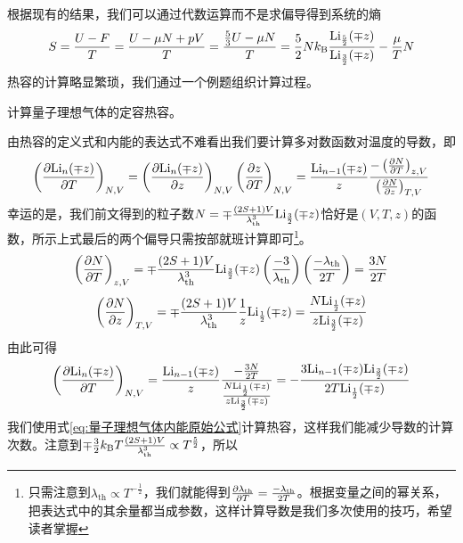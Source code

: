 \documentclass[../../main.tex]{subfiles}
\begin{document}
根据现有的结果，我们可以通过代数运算而不是求偏导得到系统的熵
\begin{equation}
    S=\frac{U-F}{T}=\frac{U-\mu N+pV}{T}=\frac{\frac{5}{3}U-\mu N}{T}=\frac{5}{2}Nk_{\mathrm{B}}\frac{\mathrm{Li}_{\frac{5}{2}}(\mp z)}{\mathrm{Li}_{\frac{3}{2}}(\mp z)}-\frac{\mu}{T}N
\end{equation}
热容的计算略显繁琐，我们通过一个例题组织计算过程。
\begin{example}
    计算量子理想气体的定容热容。
    \begin{solution}
        由热容的定义式和内能的表达式不难看出我们要计算多对数函数对温度的导数，即
        \begin{equation}
            \left(\pdv{\mathrm{Li}_{n}(\mp z)}{T}\right)_{N,V}=\left(\pdv{\mathrm{Li}_{n}(\mp z)}{z}\right)_{N,V}\left(\pdv{z}{T}\right)_{N,V}=\frac{\mathrm{Li}_{n-1}(\mp z)}{z}\frac{-\left(\pdv{N}{T}\right)_{z,V}}{\left(\pdv{N}{z}\right)_{T,V}}
        \end{equation}
        幸运的是，我们前文得到的粒子数\(N=\mp\frac{(2S+1)V}{\lambda_{\mathrm{th}}^{3}}\mathrm{Li}_{\frac{3}{2}}(\mp z)\)恰好是\((V,T,z)\)的函数，所示上式最后的两个偏导只需按部就班计算即可\footnote{只需注意到\(\lambda_{\mathrm{th}}\propto T^{-\frac{1}{2}}\)，我们就能得到\(\pdv{\lambda_{\mathrm{th}}}{T}=\frac{-\lambda_{\mathrm{th}}}{2T}\)。根据变量之间的幂关系，把表达式中的其余量都当成参数，这样计算导数是我们多次使用的技巧，希望读者掌握}。
        \begin{equation}
            \left(\pdv{N}{T}\right)_{z,V}=\mp\frac{(2S+1)V}{\lambda_{\mathrm{th}}^{3}}\mathrm{Li}_{\frac{3}{2}}(\mp z)\left(\frac{-3}{\lambda_{\mathrm{th}}}\right)\left(\frac{-\lambda_{\mathrm{th}}}{2T}\right)=\frac{3N}{2T}
        \end{equation}
        \begin{equation}
            \left(\pdv{N}{z}\right)_{T,V}=\mp\frac{(2S+1)V}{\lambda_{\mathrm{th}}^{3}}\frac{1}{z}\mathrm{Li}_{\frac{1}{2}}(\mp z)=\frac{N\mathrm{Li}_{\frac{1}{2}}(\mp z)}{z\mathrm{Li}_{\frac{3}{2}}(\mp z)}
        \end{equation}
        由此可得
        \begin{equation}
            \left(\pdv{\mathrm{Li}_{n}(\mp z)}{T}\right)_{N,V}=\frac{\mathrm{Li}_{n-1}(\mp z)}{z}\frac{-\frac{3N}{2T}}{\frac{N\mathrm{Li}_{\frac{1}{2}}(\mp z)}{z\mathrm{Li}_{\frac{3}{2}}(\mp z)}}=-\frac{3\mathrm{Li}_{n-1}(\mp z)\mathrm{Li}_{\frac{3}{2}}(\mp z)}{2T\mathrm{Li}_{\frac{1}{2}}(\mp z)}
        \end{equation}
        我们使用式\eqref{eq:量子理想气体内能原始公式}计算热容，这样我们能减少导数的计算次数。注意到\(\mp\frac{3}{2}k_{\mathrm{B}} T\frac{(2S+1)V}{\lambda_{\mathrm{th}}^{3}}\propto T^{\frac{5}{2}}\)，所以

\end{solution}
\end{example}
\end{document}
